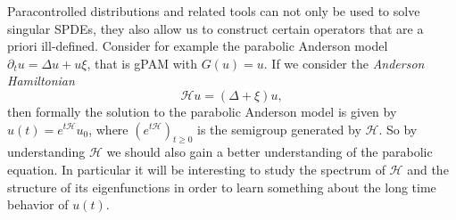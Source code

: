 \documentclass[a4paper, 11pt]{article}
\newcommand{\tmtextit}[1]{{\itshape{#1}}}
\begin{document}
Paracontrolled distributions and related tools can not only be used to solve
singular SPDEs, they also allow us to construct certain operators that are a
priori ill-defined. Consider for example the parabolic Anderson model
$\partial_t u = \Delta u + u \xi$, that is gPAM with $G (u) = u$. If we
consider the \tmtextit{Anderson Hamiltonian}
\[ \mathcal{H}u = (\Delta + \xi) u, \]
then formally the solution to the parabolic Anderson model is given by $u (t)
= e^{t\mathcal{H}} u_0$, where $(e^{t\mathcal{H}})_{t \geqslant 0}$ is the
semigroup generated by $\mathcal{H}$. So by understanding $\mathcal{H}$ we
should also gain a better understanding of the parabolic equation. In
particular it will be interesting to study the spectrum of $\mathcal{H}$
and the structure of its eigenfunctions in order to learn something about the long time behavior of $u(t)$.
\end{document}
